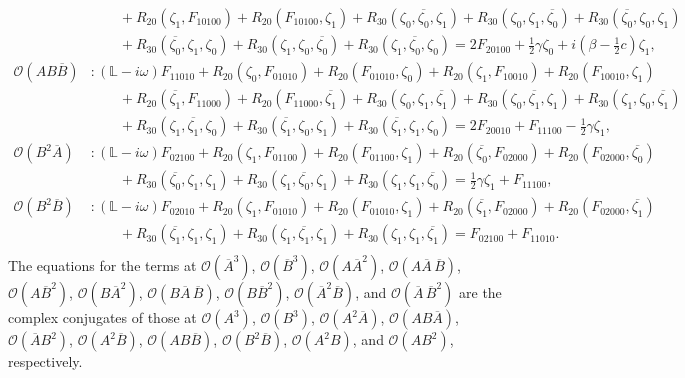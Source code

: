 \documentclass[11pt]{article}
\numberwithin{equation}{section}
\begin{document}
\begin{equation}
\begin{split}
&{\qquad  } 
+ R_{20}(\zeta_1,F_{10100}) + R_{20}(F_{10100},\zeta_1) 
+ R_{30}(\zeta_0,\overline{\zeta_0},\zeta_1)
+ R_{30}(\zeta_0,\zeta_1,\overline{\zeta_0})
+ R_{30}(\overline{\zeta_0},\zeta_0,\zeta_1) \\
&{\qquad }
+ R_{30}(\overline{\zeta_0},\zeta_1,\zeta_0)
+ R_{30}(\zeta_1,\zeta_0,\overline{\zeta_0})
+ R_{30}(\zeta_1,\overline{\zeta_0},\zeta_0)
= 2 F_{20100} + \frac{1}{2}\gamma \zeta_0 + i \left(\beta - \frac{1}{2}c\right) \zeta_1, \\
\mathcal{O}(AB\overline{B}) &: (\mathbb{L} - i \omega) F_{11010} 
+ R_{20}(\zeta_0,F_{01010}) + R_{20}(F_{01010},\zeta_0) 
+ R_{20}(\zeta_1,F_{10010}) + R_{20}(F_{10010},\zeta_1) \\
&{\qquad  } 
+ R_{20}(\overline{\zeta_1},F_{11000}) + R_{20}(F_{11000},\overline{\zeta_1}) 
+ R_{30}(\zeta_0,\zeta_1,\overline{\zeta_1})
+ R_{30}(\zeta_0,\overline{\zeta_1},\zeta_1)
+ R_{30}(\zeta_1,\zeta_0,\overline{\zeta_1}) \\
&{\qquad }
+ R_{30}(\zeta_1,\overline{\zeta_1},\zeta_0)
+ R_{30}(\overline{\zeta_1},\zeta_0,\zeta_1)
+ R_{30}(\overline{\zeta_1},\zeta_1,\zeta_0)
= 2 F_{20010} + F_{11100} - \frac{1}{2}\gamma \zeta_1, \\
\mathcal{O}(B^2\overline{A}) &: (\mathbb{L} - i \omega) F_{02100} 
+ R_{20}(\zeta_1,F_{01100}) + R_{20}(F_{01100},\zeta_1) 
+ R_{20}(\overline{\zeta_0},F_{02000}) + R_{20}(F_{02000},\overline{\zeta_0}) \\
&{\qquad} + R_{30}(\overline{\zeta_0},\zeta_1,\zeta_1)
+ R_{30}(\zeta_1,\overline{\zeta_0},\zeta_1)
+ R_{30}(\zeta_1,\zeta_1,\overline{\zeta_0})
= \frac{1}{2} \gamma \zeta_1 + F_{11100}, \\
\mathcal{O}(B^2\overline{B}) &: (\mathbb{L} - i \omega) F_{02010} 
+ R_{20}(\zeta_1,F_{01010}) + R_{20}(F_{01010},\zeta_1) 
+ R_{20}(\overline{\zeta_1},F_{02000}) + R_{20}(F_{02000},\overline{\zeta_1}) \\
&{\qquad} + R_{30}(\overline{\zeta_1},\zeta_1,\zeta_1)
+ R_{30}(\zeta_1,\overline{\zeta_1},\zeta_1)
+ R_{30}(\zeta_1,\zeta_1,\overline{\zeta_1})
= F_{02100} + F_{11010}. \\
\end{split}
\end{equation}
The equations for the terms at
$\mathcal{O}(\overline{A}^3)$,
$\mathcal{O}(\overline{B}^3)$,
$\mathcal{O}(A \overline{A}^2)$,
$\mathcal{O}(A \overline{A}\, \overline{B})$,
$\mathcal{O}(A \overline{B}^2)$,
$\mathcal{O}(B \overline{A}^2)$,
$\mathcal{O}(B \overline{A}\, \overline{B})$,
$\mathcal{O}(B \overline{B}^2)$,
$\mathcal{O}(\overline{A}^2 \overline{B})$, and
$\mathcal{O}(\overline{A}\, \overline{B}^2)$
are the complex conjugates of those at
$\mathcal{O}(A^3)$,
$\mathcal{O}(B^3)$,
$\mathcal{O}(A^2 \overline{A})$,
$\mathcal{O}(AB \overline{A})$,
$\mathcal{O}(\overline{A} B^2)$,
$\mathcal{O}(A^2 \overline{B})$,
$\mathcal{O}(AB\overline{B})$,
$\mathcal{O}(B^2 \overline{B})$, 
$\mathcal{O}(A^2 B)$, and
$\mathcal{O}(A B^2)$,
respectively.
\end{document}

